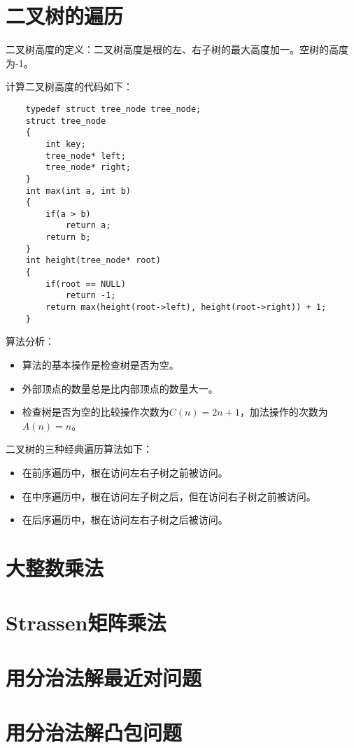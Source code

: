 \documentclass[a4paper,left=2.5cm,right=2.5cm,11pt]{article}
\begin{document}
\section{二叉树的遍历}
	二叉树高度的定义：二叉树高度是根的左、右子树的最大高度加一。空树的高度为-1。\par

	计算二叉树高度的代码如下：
	\begin{lstlisting}
	typedef struct tree_node tree_node;
	struct tree_node
	{
		int key;
		tree_node* left;
		tree_node* right;
	}
	int max(int a, int b)
	{
		if(a > b)
			return a;
		return b;
	}
	int height(tree_node* root)
	{
		if(root == NULL)
			return -1;
		return max(height(root->left), height(root->right)) + 1;
	}
	\end{lstlisting}

	算法分析：
	\begin{itemize}
		\item 算法的基本操作是检查树是否为空。
		\item 外部顶点的数量总是比内部顶点的数量大一。
		\item 检查树是否为空的比较操作次数为$C(n) = 2n + 1$，加法操作的次数为$A(n) = n$。
	\end{itemize}

	二叉树的三种经典遍历算法如下：
	\begin{itemize}
		\item 在前序遍历中，根在访问左右子树之前被访问。
		\item 在中序遍历中，根在访问左子树之后，但在访问右子树之前被访问。
		\item 在后序遍历中，根在访问左右子树之后被访问。
	\end{itemize}

\section{大整数乘法}
\section{Strassen矩阵乘法}
\section{用分治法解最近对问题}
\section{用分治法解凸包问题}
\end{document}
